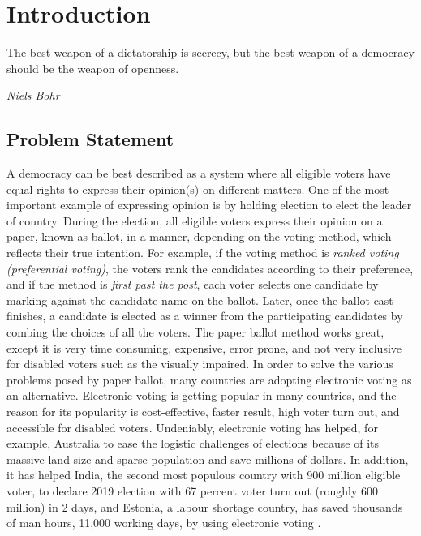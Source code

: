 \chapter{Introduction}
\label{cha:intro}
\epigraph{The best weapon of a dictatorship is secrecy, but the best weapon of a democracy should be the weapon of openness.} 
{\textit{Niels Bohr}} 

\section{Problem Statement}
A democracy can be best described as a system where all eligible voters have equal rights to express their opinion(s) on different matters. 
One of the most important example of expressing opinion is by holding election to elect the leader of country. During the 
election, all eligible voters express their opinion on a paper,  known as ballot,  in a manner, depending on the voting method, 
which reflects their true intention.  For example, if the voting method is \textit{ranked voting (preferential voting)},  the voters rank the 
candidates according to their preference, and if the method is \textit{first past the post},  each voter selects one candidate by marking
against the candidate name on the ballot. Later, once the ballot cast finishes, a candidate is elected as a winner from  the participating
candidates by combing the choices of all the voters. 
The paper ballot method works great, except it is very time consuming, expensive, error prone, 
and not very inclusive for disabled voters such as the visually impaired.
In order to solve the various problems posed by paper ballot, many countries are adopting electronic voting as an alternative. 
Electronic voting is 
getting popular in many countries, and the reason for its popularity is cost-effective, faster result, high voter turn out, 
and accessible for disabled voters.  
Undeniably, electronic voting has helped, for example, Australia to ease the logistic challenges of elections because of its massive land size and sparse
population and save millions of dollars.  In addition, it has helped India, the second most populous country with 900 million eligible voter, to declare 
2019 election with 67 percent voter turn out (roughly 600 million) in 2 days, and  Estonia, a labour shortage country, has saved 
thousands of man hours, 11,000 working days, by using electronic voting \citep{Estonia}.

